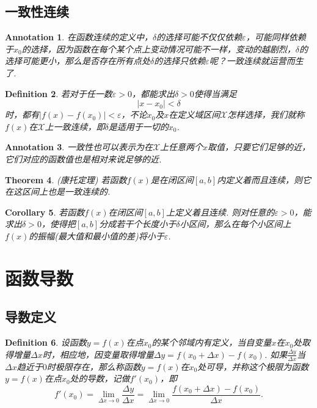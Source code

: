\documentclass{article}
\newtheorem{theorem}{Theorem}[section]
\newtheorem{corollary}[theorem]{Corollary}
\newtheorem{definition}[theorem]{Definition}
\newtheorem{annotation}[theorem]{Annotation}
\begin{document}
\subsection{一致性连续}

\begin{annotation}
\rm 在函数连续的定义中，$\delta$的选择可能不仅仅依赖$\varepsilon$，可能同样依赖于$x_0$的选择，因为函数在每个某个点上变动情况可能不一样，变动的越剧烈，$\delta$的选择可能更小，那么是否存在所有点处$\delta$的选择只依赖$\varepsilon$呢？一致连续就运营而生了.
\end{annotation}

\begin{definition}
\rm 若对于任一数$\varepsilon > 0$，都能求出$\delta > 0$使得当满足
$$
|x-x_0| < \delta
$$
时，都有$|f(x)-f(x_0)| < \varepsilon$，不论$x_0$及$x$在定义域区间$\mathcal{X}$怎样选择，我们就称$f(x)$在$\mathcal{X}$上{\color{red}一致连续}，即$\delta$是适用于一切的$x_0$.
\end{definition}

\begin{annotation}
\rm 一致性也可以表示为在$\mathcal{X}$上任意两个$x$取值，只要它们足够的近，它们对应的函数值也是相对来说足够的近. 
\end{annotation}

\begin{theorem}
\rm {\color{red} (康托定理) }若函数$f(x)$是在闭区间$[a,b]$内定义着而且连续，则它在这区间上也是一致连续的.
\end{theorem}

\begin{corollary}
\rm 若函数$f(x)$在闭区间$[a,b]$上定义着且连续. 则对任意的$\varepsilon > 0$，能求出$\delta > 0$，使得把$[a,b]$分成若干个长度小于$\delta$小区间，那么在每个小区间上$f(x)$的振幅(最大值和最小值的差)将小于$\varepsilon$.
\end{corollary}

\newpage
\section{函数导数}

\subsection{导数定义}

\begin{definition}
\rm 设函数$y=f(x)$在点$x_0$的某个邻域内有定义，当自变量$x$在$x_0$处取得增量$\Delta x$时，相应地，因变量取得增量$\Delta y = f(x_0 + \Delta x) - f(x_0)$. 如果$\frac{\Delta y}{\Delta x}$当$\Delta x$趋近于$0$时极限存在，那么称函数$y = f(x)$在$x_0$处可导，并称这个极限为函数$y=f(x)$在点$x_0$处的导数，记做$f'(x_0)$，即
$$
f'(x_0) = \lim\limits_{\Delta x \rightarrow 0} \frac{\Delta y}{\Delta x} = \lim\limits_{\Delta x \rightarrow 0} \frac{f(x_0 + \Delta x) - f(x_0)}{\Delta x}.
$$
\end{definition}
\end{document}
